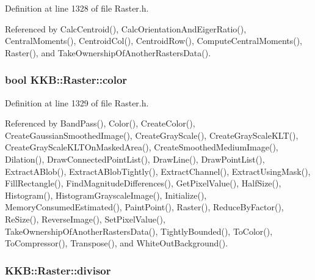 Definition at line 1328 of file Raster.\+h.



Referenced by Calc\+Centroid(), Calc\+Orientation\+And\+Eiger\+Ratio(), Central\+Moments(), Centroid\+Col(), Centroid\+Row(), Compute\+Central\+Moments(), Raster(), and Take\+Ownership\+Of\+Another\+Rasters\+Data().

\subsubsection[{\texorpdfstring{color}{color}}]{\setlength{\rightskip}{0pt plus 5cm}bool K\+K\+B\+::\+Raster\+::color\hspace{0.3cm}{\ttfamily [protected]}}\hypertarget{class_k_k_b_1_1_raster_a482384d89cc53fa4f36276307c746854}{}\label{class_k_k_b_1_1_raster_a482384d89cc53fa4f36276307c746854}


Definition at line 1329 of file Raster.\+h.



Referenced by Band\+Pass(), Color(), Create\+Color(), Create\+Gaussian\+Smoothed\+Image(), Create\+Gray\+Scale(), Create\+Gray\+Scale\+K\+L\+T(), Create\+Gray\+Scale\+K\+L\+T\+On\+Masked\+Area(), Create\+Smoothed\+Medium\+Image(), Dilation(), Draw\+Connected\+Point\+List(), Draw\+Line(), Draw\+Point\+List(), Extract\+A\+Blob(), Extract\+A\+Blob\+Tightly(), Extract\+Channel(), Extract\+Using\+Mask(), Fill\+Rectangle(), Find\+Magnitude\+Differences(), Get\+Pixel\+Value(), Half\+Size(), Histogram(), Histogram\+Grayscale\+Image(), Initialize(), Memory\+Consumed\+Estimated(), Paint\+Point(), Raster(), Reduce\+By\+Factor(), Re\+Size(), Reverse\+Image(), Set\+Pixel\+Value(), Take\+Ownership\+Of\+Another\+Rasters\+Data(), Tightly\+Bounded(), To\+Color(), To\+Compressor(), Transpose(), and White\+Out\+Background().

\subsubsection[{\texorpdfstring{divisor}{divisor}}]{ K\+K\+B\+::\+Raster\+::divisor\hspace{0.3cm}{\ttfamily [protected]}}\hypertarget{class_k_k_b_1_1_raster_afaaaf54fd824a4a47fba97f7fba9398f}{}\label{class_k_k_b_1_1_raster_afaaaf54fd824a4a47fba97f7fba9398f}


